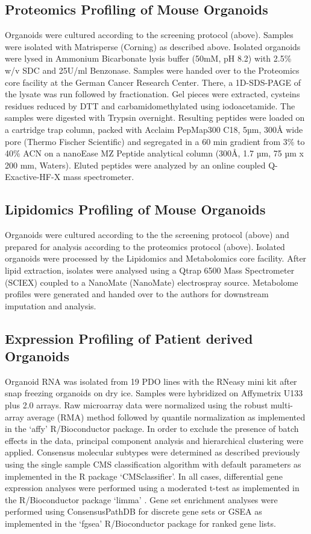 \begin{flushleft}
\subsection{Proteomics Profiling of Mouse Organoids}
Organoids were cultured according to the screening protocol (above). Samples were isolated with Matrisperse (Corning) as described above. Isolated organoids were lysed in Ammonium Bicarbonate lysis buffer (50mM, pH 8.2) with 2.5\% w/v SDC and 25U/ml Benzonase. 
Samples were handed over to the Proteomics core facility at the German Cancer Research Center. There, a 1D-SDS-PAGE of the lysate was run followed by fractionation. Gel pieces were extracted, cysteins residues reduced by DTT and carbamidomethylated using iodoacetamide. The samples were digested with Trypsin overnight.
Resulting peptides were loaded on a cartridge trap column, packed with Acclaim PepMap300 C18, 5µm, 300Å wide pore (Thermo Fischer Scientific) and segregated in a 60 min gradient from 3\% to 40\% ACN on a nanoEase MZ Peptide analytical column (300Å, 1.7 µm, 75 µm x 200 mm, Waters). Eluted peptides were analyzed by an online coupled Q-Exactive-HF-X mass spectrometer.

\subsection{Lipidomics Profiling of Mouse Organoids}
Organoids were cultured according to the the screening protocol (above) and prepared for analysis according to the proteomics protocol (above). 
Isolated organoids were processed by the Lipidomics and Metabolomics core facility. 
After lipid extraction, isolates were analysed using a Qtrap 6500 Mass Spectrometer (SCIEX) coupled to a NanoMate (NanoMate) electrospray source. Metabolome profiles were generated and handed over to the authors for downstream imputation and analysis.

\subsection{Expression Profiling of Patient derived Organoids}
Organoid RNA was isolated from 19 PDO lines with the RNeasy mini kit after snap freezing organoids on dry ice. Samples were hybridized on Affymetrix U133 plus 2.0 arrays. Raw microarray data were normalized using the robust multi-array average (RMA) method \cite{Irizarry2003-vi} followed by quantile normalization as implemented in the ‘affy’ \cite{Gautier2004-jj} R/Bioconductor \cite{Huber2015-kc} package. In order to exclude the presence of batch effects in the data, principal component analysis and hierarchical clustering were applied. Consensus molecular subtypes were determined as described previously using the single sample CMS classification algorithm with default parameters as implemented in the R package ‘CMSclassifier’. In all cases, differential gene expression analyses were performed using a moderated t-test as implemented in the R/Bioconductor package ‘limma’ \cite{Ritchie2015-vf}. Gene set enrichment analyses were performed using ConsensusPathDB \cite{Kamburov2013-co} for discrete gene sets or GSEA as implemented in the ‘fgsea’ \cite{Korotkevich2021-xu} R/Bioconductor package for ranked gene lists.


\end{flushleft}
